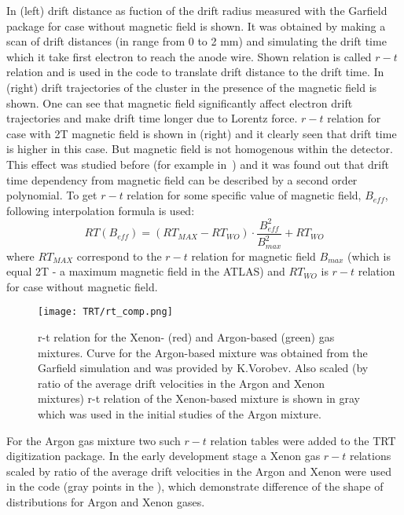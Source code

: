 In  (left) drift distance as fuction of the drift radius measured with the Garfield package for case without magnetic field is shown.
It was obtained by making a scan of drift distances (in range from 0 to 2 mm) and simulating the drift time which it take first electron to reach the anode wire.
Shown relation is called $r-t$ relation and is used in the code to translate drift distance to the drift time.
In  (right) drift trajectories of the cluster in the presence of the magnetic field is shown. One can see that magnetic field
significantly affect electron drift trajectories and make drift time longer due to Lorentz force. $r-t$ relation for case with 2T magnetic field is shown
in  (right) and it clearly seen that drift time is higher in this case. But magnetic field is not homogenous within the detector.
This effect was studied before (for example in~\cite{esben_thesis}) and it was found out that drift time dependency from magnetic field can be 
described by a second order polynomial. 
To get $r-t$ relation for some specific value of magnetic field, $B_{eff}$, following interpolation formula is used:
\begin{displaymath}
    RT(B_{eff}) = (RT_{MAX} - RT_{WO}) \cdot \dfrac{B_{eff}^2}{B_{max}^2} + RT_{WO}
\end{displaymath}
where $RT_{MAX}$ correspond to the $r-t$ relation for magnetic field $B_{max}$ (which is equal 2T - a maximum magnetic field in the ATLAS) and $RT_{WO}$ is 
$r-t$ relation for case without magnetic field.

\begin{figure}
\centering
 \texttt{[image: TRT/rt\_comp.png]}
\caption{r-t relation for the Xenon- (red) and Argon-based (green) gas mixtures. Curve for the Argon-based mixture was obtained from the Garfield simulation and
was provided by K.Vorobev. Also scaled (by ratio of the average drift velocities in the Argon and Xenon mixtures) 
r-t relation of the Xenon-based mixture is shown in gray which was used in the initial studies of the Argon mixture.
}
\label{fig:rt_comp}
\end{figure}

For the Argon gas mixture two such $r-t$ relation tables were added to the TRT digitization package.
In the early development stage a Xenon gas $r-t$ relations scaled by ratio of the average drift velocities in the Argon and Xenon were used in the code 
(gray points in the ), which demonstrate difference of the shape of distributions for Argon and Xenon gases.

